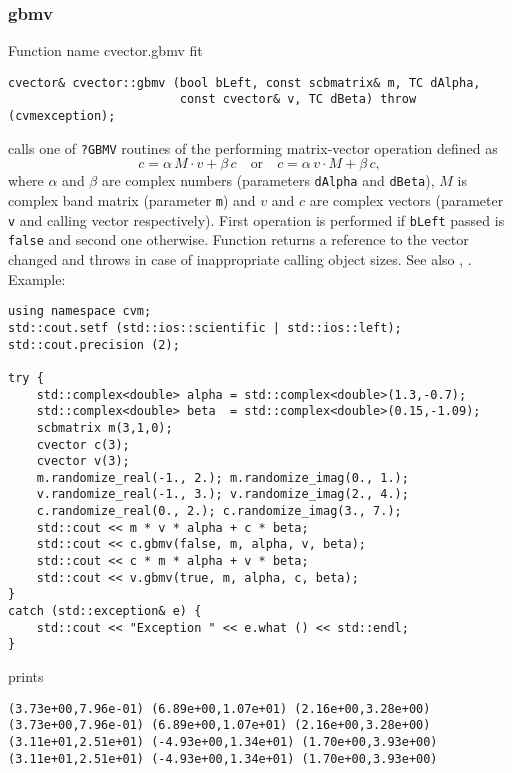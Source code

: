 \subsubsection{gbmv}
Function%
\pdfdest name {cvector.gbmv} fit
\begin{verbatim}
cvector& cvector::gbmv (bool bLeft, const scbmatrix& m, TC dAlpha,
                        const cvector& v, TC dBeta) throw (cvmexception);
\end{verbatim}
calls one of \verb"?GBMV" routines of the
performing  matrix-vector operation defined as
\begin{equation*}
c=\alpha\,M\cdot v + \beta\,c\quad\text{or}\quad c=\alpha\,v\cdot M + \beta\, c,
\end{equation*}
where $\alpha$ and $\beta$ are complex numbers
(parameters \verb"dAlpha" and \verb"dBeta"),
$M$ is  complex band matrix (parameter \verb"m")
and $v$ and $c$ are complex vectors (parameter \verb"v"
and calling vector respectively).
First operation is performed if \verb"bLeft" passed
is \verb"false" and second one otherwise.
Function
returns a reference to the vector changed and throws
in case of inappropriate calling object sizes.
See also
,
.
Example:
\begin{Verbatim}
using namespace cvm;
std::cout.setf (std::ios::scientific | std::ios::left);
std::cout.precision (2);

try {
    std::complex<double> alpha = std::complex<double>(1.3,-0.7);
    std::complex<double> beta  = std::complex<double>(0.15,-1.09);
    scbmatrix m(3,1,0);
    cvector c(3);
    cvector v(3);
    m.randomize_real(-1., 2.); m.randomize_imag(0., 1.);
    v.randomize_real(-1., 3.); v.randomize_imag(2., 4.);
    c.randomize_real(0., 2.); c.randomize_imag(3., 7.);
    std::cout << m * v * alpha + c * beta;
    std::cout << c.gbmv(false, m, alpha, v, beta);
    std::cout << c * m * alpha + v * beta;
    std::cout << v.gbmv(true, m, alpha, c, beta);
}
catch (std::exception& e) {
    std::cout << "Exception " << e.what () << std::endl;
}
\end{Verbatim}
prints
\begin{Verbatim}
(3.73e+00,7.96e-01) (6.89e+00,1.07e+01) (2.16e+00,3.28e+00)
(3.73e+00,7.96e-01) (6.89e+00,1.07e+01) (2.16e+00,3.28e+00)
(3.11e+01,2.51e+01) (-4.93e+00,1.34e+01) (1.70e+00,3.93e+00)
(3.11e+01,2.51e+01) (-4.93e+00,1.34e+01) (1.70e+00,3.93e+00)
\end{Verbatim}
\newpage





